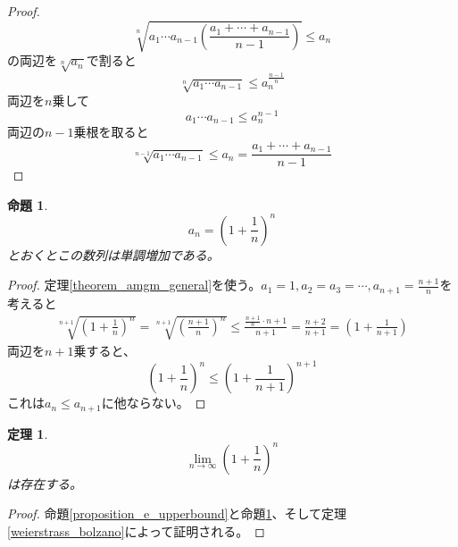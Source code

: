 \documentclass{ltjsarticle}
\newtheorem{theorem}{定理}[section]
\newtheorem{proposition}{命題}[section]
\begin{document}
\begin{proof}
\begin{equation*}
\sqrt[n]{a_1\cdots a_{n-1}\left({\frac {a_1+\cdots+a_{n-1}} {n-1}}\right)} \leq a_n
\end{equation*}
の両辺を$\sqrt[n]{a_n}$で割ると
\begin{equation*}
\sqrt[n]{a_1\cdots a_{n-1}} \leq a_n^{{\frac {n-1} n}}
\end{equation*}
両辺を$n$乗して
\begin{equation*}
a_1\cdots a_{n-1} \leq a_n^{n-1}
\end{equation*}
両辺の$n-1$乗根を取ると
\begin{equation*}
\sqrt[n-1]{a_1\cdots a_{n-1} }\leq a_n={\frac {a_1+\cdots+a_{n-1}} {n-1}}
\end{equation*}
\end{proof}

\begin{proposition}
\label{proposition_e_increasing}
\begin{equation*}
a_n = \left(1+{\frac 1 n}\right)^n
\end{equation*}
とおくとこの数列は単調増加である。
\end{proposition}
\begin{proof}

定理\ref{theorem_amgm_general}を使う。$a_1=1,a_2=a_3=\cdots,a_{n+1} = {\frac {n+1} n}$を考えると
\begin{align*}
\sqrt[n+1]{\left(1+{\frac {1} n}\right)^n}=\sqrt[n+1]{\left({\frac {n+1} n}\right)^n}\leq {\frac {{\frac {n+1} {n}}\cdot n+1} {n+1}} = {\frac {n+2} {n+1}}=\left(1+{\frac 1 {n+1}}\right)
\end{align*}
両辺を$n+1$乗すると、
\begin{equation*}
\left(1+{\frac {1} n}\right)^n\leq \left(1+{\frac 1 {n+1}}\right)^{n+1}
\end{equation*}
これは$a_n\leq a_{n+1}$に他ならない。
\end{proof}

\begin{theorem}
\begin{equation*}
\lim_{n\to\infty}\left(1+{\frac 1 n}\right)^n
\end{equation*}
は存在する。
\end{theorem}
\begin{proof}
命題\ref{proposition_e_upperbound}と命題\ref{proposition_e_increasing}、そして定理\ref{weierstrass_bolzano}によって証明される。
\end{proof}
\end{document}

